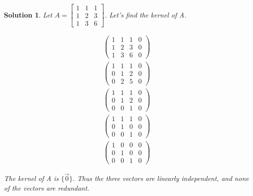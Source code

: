 \documentclass{article}
\newtheorem*{solution}{Solution}
\begin{document}
\begin{solution}
Let $A = \begin{bmatrix} 1 & 1 & 1 \\ 1 & 2 & 3 \\ 1 & 3 & 6 \end{bmatrix}$. Let's find the kernel of A.

\begin{align*}
\left( \begin{array}{ccc|c} 1 & 1 & 1 & 0 \\ 1 & 2 & 3 & 0 \\ 1 & 3 & 6 & 0\end{array} \right) \\
\left( \begin{array}{ccc|c} 1 & 1 & 1 & 0 \\ 0 & 1 & 2 & 0 \\ 0 & 2 & 5 & 0\end{array} \right) \\
\left( \begin{array}{ccc|c} 1 & 1 & 1 & 0 \\ 0 & 1 & 2 & 0 \\ 0 & 0 & 1 & 0\end{array} \right) \\
\left( \begin{array}{ccc|c} 1 & 1 & 1 & 0 \\ 0 & 1 & 0 & 0 \\ 0 & 0 & 1 & 0\end{array} \right) \\
\left( \begin{array}{ccc|c} 1 & 0 & 0 & 0 \\ 0 & 1 & 0 & 0 \\ 0 & 0 & 1 & 0\end{array} \right) 
\end{align*}

The kernel of A is $\{ \vec{0} \}$. Thus the three vectors are linearly independent, and none of the vectors are redundant.
\end{solution}
\end{document}

